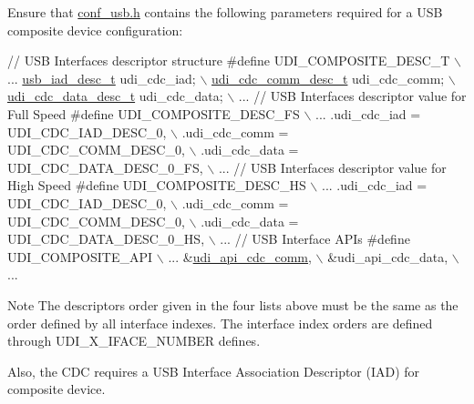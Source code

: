 \begin{DoxyEnumerate}
\begin{DoxyItemize}
\end{DoxyItemize}
\item Ensure that \hyperlink{conf__usb_8h}{conf\-\_\-usb.\-h} contains the following parameters required for a U\-S\-B composite device configuration\-:
\begin{DoxyItemize}
\item 
\begin{DoxyCode}
 \textcolor{comment}{// USB Interfaces descriptor structure}
\textcolor{preprocessor}{        #define UDI\_COMPOSITE\_DESC\_T \(\backslash\)}
\textcolor{preprocessor}{           ...}
\textcolor{preprocessor}{}           \hyperlink{structusb__iad__desc__t}{usb\_iad\_desc\_t} udi\_cdc\_iad; \hyperlink{structudi__cdc__comm__desc__t}{\(\backslash\)}
\hyperlink{structudi__cdc__comm__desc__t}{           udi\_cdc\_comm\_desc\_t} udi\_cdc\_comm; \hyperlink{structudi__cdc__data__desc__t}{\(\backslash\)}
\hyperlink{structudi__cdc__data__desc__t}{           udi\_cdc\_data\_desc\_t} udi\_cdc\_data; \(\backslash\)
           ...
        \textcolor{comment}{// USB Interfaces descriptor value for Full Speed}
\textcolor{preprocessor}{        #define UDI\_COMPOSITE\_DESC\_FS \(\backslash\)}
\textcolor{preprocessor}{           ...}
\textcolor{preprocessor}{}           .udi\_cdc\_iad               = UDI\_CDC\_IAD\_DESC\_0, \(\backslash\)
           .udi\_cdc\_comm              = UDI\_CDC\_COMM\_DESC\_0, \(\backslash\)
           .udi\_cdc\_data              = UDI\_CDC\_DATA\_DESC\_0\_FS, \(\backslash\)
           ...
        \textcolor{comment}{// USB Interfaces descriptor value for High Speed}
\textcolor{preprocessor}{        #define UDI\_COMPOSITE\_DESC\_HS \(\backslash\)}
\textcolor{preprocessor}{           ...}
\textcolor{preprocessor}{}           .udi\_cdc\_iad               = UDI\_CDC\_IAD\_DESC\_0, \(\backslash\)
           .udi\_cdc\_comm              = UDI\_CDC\_COMM\_DESC\_0, \(\backslash\)
           .udi\_cdc\_data              = UDI\_CDC\_DATA\_DESC\_0\_HS, \(\backslash\)
           ...
        \textcolor{comment}{// USB Interface APIs}
\textcolor{preprocessor}{        #define UDI\_COMPOSITE\_API \(\backslash\)}
\textcolor{preprocessor}{           ...}
\textcolor{preprocessor}{}           &\hyperlink{group__udi__cdc__group__udc_gad7b0a90350a1f1a7c62fab1a749bf687}{udi\_api\_cdc\_comm},       \(\backslash\)
           &udi\_api\_cdc\_data,       \(\backslash\)
           ... 
\end{DoxyCode}

\item \begin{DoxyNote}{Note}
The descriptors order given in the four lists above must be the same as the order defined by all interface indexes. The interface index orders are defined through U\-D\-I\-\_\-\-X\-\_\-\-I\-F\-A\-C\-E\-\_\-\-N\-U\-M\-B\-E\-R defines.\par
 Also, the C\-D\-C requires a U\-S\-B Interface Association Descriptor (I\-A\-D) for composite device. 
\end{DoxyNote}


\end{DoxyItemize}
\end{DoxyEnumerate}
